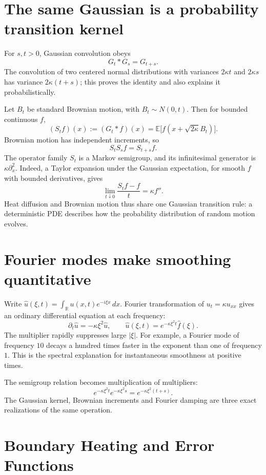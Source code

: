 \section{The same Gaussian is a probability transition kernel}

For \(s,t>0\), Gaussian convolution obeys
\[
 G_t*G_s=G_{t+s}.
\]
The convolution of two centered normal distributions with variances \(2\kappa t\) and \(2\kappa s\) has variance \(2\kappa(t+s)\); this proves the identity and also explains it probabilistically.

Let \(B_t\) be standard Brownian motion, with \(B_t\sim N(0,t)\). Then for bounded continuous \(f\),
\[
 (S_tf)(x):=(G_t*f)(x)
   =\mathbb E\bigl[f(x+\sqrt{2\kappa}B_t)\bigr].
\]
Brownian motion has independent increments, so
\[
 S_tS_sf=S_{t+s}f.
\]
The operator family \(S_t\) is a Markov semigroup, and its infinitesimal generator is \(\kappa\partial_x^2\). Indeed, a Taylor expansion under the Gaussian expectation, for smooth \(f\) with bounded derivatives, gives
\[
 \lim_{t\downarrow0}\frac{S_tf-f}{t}=\kappa f''.
\]
Heat diffusion and Brownian motion thus share one Gaussian transition rule: a deterministic PDE describes how the probability distribution of random motion evolves.

\section{Fourier modes make smoothing quantitative}

Write \(\widehat u(\xi,t)=\int_\mathbb R u(x,t)e^{-i\xi x}\,dx\). Fourier transformation of \(u_t=\kappa u_{xx}\) gives an ordinary differential equation at each frequency:
\[
 \partial_t\widehat u=-\kappa\xi^2\widehat u,\qquad
 \boxed{\widehat u(\xi,t)=e^{-\kappa\xi^2t}\widehat f(\xi).}
\]
The multiplier rapidly suppresses large \(|\xi|\). For example, a Fourier mode of frequency \(10\) decays a hundred times faster in the exponent than one of frequency \(1\). This is the spectral explanation for instantaneous smoothness at positive times.

The semigroup relation becomes multiplication of multipliers:
\[
 e^{-\kappa\xi^2t}e^{-\kappa\xi^2s}
 =e^{-\kappa\xi^2(t+s)}.
\]
The Gaussian kernel, Brownian increments and Fourier damping are three exact realizations of the same operation.

\section{Boundary Heating and Error Functions}


